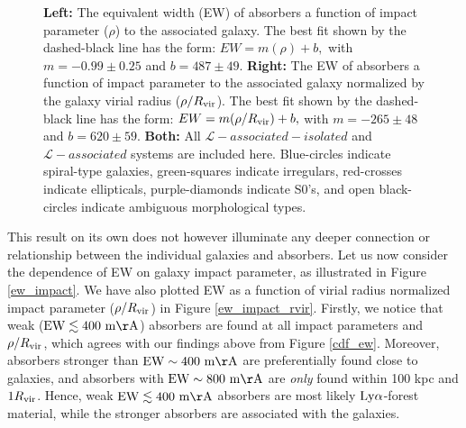 \begin{figure}[ht!]
        \centering
        \vspace{0pt}
        \caption{\small{\textbf{Left: } The equivalent width (EW) of absorbers a function of impact parameter ($\rho$) to the associated galaxy. The best fit shown by the dashed-black line has the form: $EW = m (\rho) + b,$ with $m = -0.99 \pm 0.25$ and $b = 487 \pm 49$. \textbf{Right:} The EW of absorbers a function of impact parameter to the associated galaxy normalized by the galaxy virial radius ($\rho / R_{\rm vir}$). The best fit shown by the dashed-black line has the form: $EW = m (\rho / R_{\rm vir}) + b,$ with $m = -265 \pm 48$ and $b = 620 \pm 59$. \textbf{Both:} All $\mathcal{L}-associated-isolated$ and $\mathcal{L}-associated$ systems are included here. Blue-circles indicate spiral-type galaxies, green-squares indicate irregulars, red-crosses indicate ellipticals, purple-diamonds indicate S0's, and open black-circles indicate ambiguous morphological types. }}
        \vspace{5pt}
        \label{ew_both}
\end{figure}


This result on its own does not however illuminate any deeper connection or relationship between the individual galaxies and absorbers. Let us now consider the dependence of EW on galaxy impact parameter, as illustrated in Figure \ref{ew_impact}. We have also plotted EW as a function of virial radius normalized impact parameter ($\rho/ R_{\rm vir}$) in Figure \ref{ew_impact_rvir}. Firstly, we notice that weak ($\rm EW \lesssim 400~m\AA$) absorbers are found at all impact parameters and $\rho / R_{\rm vir}$, which agrees with our findings above from Figure \ref{cdf_ew}. Moreover, absorbers stronger than $\rm EW \sim 400~m\AA$ are preferentially found close to galaxies, and absorbers with $\rm EW \sim 800~m\AA$ are \emph{only} found within 100 kpc and $1 R_{\rm vir}$. Hence, weak $\rm EW \lesssim 400~m\AA$ absorbers are most likely $\rm Ly\alpha$-forest material, while the stronger absorbers are associated with the galaxies.

